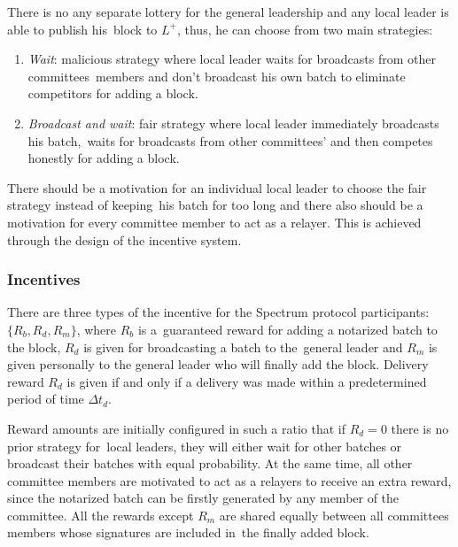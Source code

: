 There is no any separate lottery for the general leadership and any local leader is able to publish his\
block to $L^+$, thus, he can choose from two main strategies:
\begin{enumerate}
    \item \emph{Wait}: malicious strategy where local leader waits for broadcasts from other committees\
    members and don't broadcast his own batch to eliminate competitors for adding a block.
    \item \emph{Broadcast and wait}: fair strategy where local leader immediately broadcasts his batch,\
    waits for broadcasts from other committees' and then competes honestly for adding a block.
\end{enumerate}
There should be a motivation for an individual local leader to choose the fair strategy instead of keeping\
his batch for too long and there also should be a motivation for every committee member to act as a relayer.
This is achieved through the design of the incentive system.

\subsubsection{Incentives}

There are three types of the incentive for the Spectrum protocol participants: ${\{R_b, R_d, R_m\}}$, where $R_b$ is a\
guaranteed reward for adding a notarized batch to the block, $R_d$ is given for broadcasting a batch to the\
general leader and $R_m$ is given personally to the general leader who will finally add the block.
Delivery reward $R_d$ is given if and only if a delivery was made within a predetermined period of time $\Delta t_d$.

Reward amounts are initially configured in such a ratio that if ${R_d=0}$ there is no prior strategy for\
local leaders, they will either wait for other batches or broadcast their batches with equal probability.
At the same time, all other committee members are motivated to act as a relayers to receive an extra reward,
since the notarized batch can be firstly generated by any member of the committee.
All the rewards except $R_m$ are shared equally between all committees members whose signatures are included in\
the finally added block.


